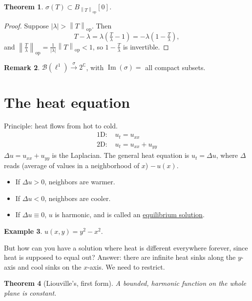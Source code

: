 \documentclass[12pt]{article}
\renewcommand{\Im}{\operatorname{Im}}
\newcommand{\abs}[1]{\left| #1 \right|}
\newcommand{\norm}[1]{\left\| #1 \right\|}
\newcommand{\C}{\mathbb{C}}
\newcommand{\cB}{\mathcal{B}}
\newtheorem{thm}{Theorem}[section]
\theoremstyle{definition}
\newtheorem{ex}[thm]{Example}
\newtheorem{rmk}[thm]{Remark}
\begin{document}
\begin{thm}
	$\sigma(T) \subset B_{\norm{T}_{\mathrm{op}}}[0]$.
\end{thm}
\begin{proof}
	Suppose $\abs{\lambda} > \norm{T}_{\mathrm{op}}$.
	Then
	\begin{equation*}
		T - \lambda = \lambda \left( \tfrac{T}{\lambda} - 1 \right) = -\lambda \left( 1 - \tfrac{T}{\lambda} \right),
	\end{equation*}
	and $\norm{\frac{T}{\lambda}}_{\mathrm{op}} = \frac{1}{\abs{\lambda}} \norm{T}_{\mathrm{op}} < 1$, so $1 - \frac{T}{\lambda}$ is invertible.
\end{proof}

\begin{rmk}
	$\cB(\ell^1) \xrightarrow{\ \sigma\ } 2^\C$, with $\Im(\sigma) = $ all compact subsets.
\end{rmk}

\section{The heat equation}

Principle: heat flows from hot to cold.
\begin{align*}
	\text{1D: } &u_t = u_{xx} \\
	\text{2D: } &u_t = u_{xx} + u_{yy}
\end{align*}
$\Delta u = u_{xx} + u_{yy}$ is the Laplacian.
The general heat equation is $u_t = \Delta u$, where $\Delta$ reads (average of values in a neighborhood of $x$) $- \, u(x)$.
\begin{itemize}[nosep]
	\item If $\Delta u > 0$, neighbors are warmer.
	\item If $\Delta u < 0$, neighbors are cooler.
	\item If $\Delta u \equiv 0$, $u$ is harmonic, and is called an \underline{equilibrium solution}.
\end{itemize}

\begin{ex}
	$u(x,y) = y^2 - x^2$.
\end{ex}

\noindent But how can you have a solution where heat is different everywhere forever, since heat is supposed to equal out?
Answer: there are infinite heat sinks along the $y$-axis and cool sinks on the $x$-axis.
We need to restrict.

\begin{thm}[Liouville's, first form]
	A bounded, harmonic function on the whole plane is constant.
\end{thm}
\end{document}
